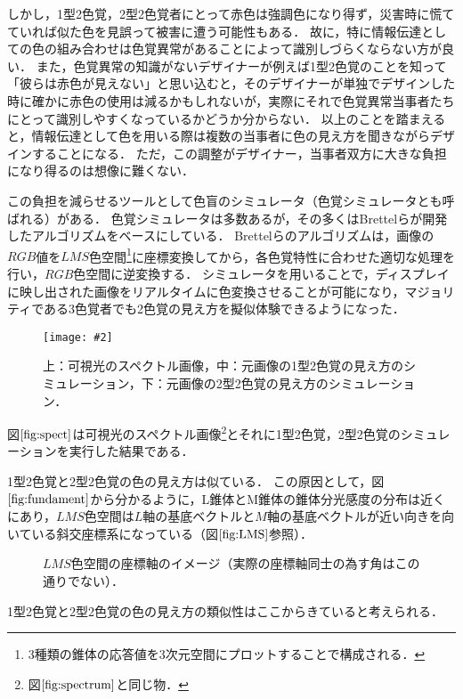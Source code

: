 \documentclass[uplatex,paper=a4,fontsize=4.0truemm,jafontsize=4.0truemm,head_space=30.0truemm,foot_space=30.0truemm,baselineskip=8.0truemm,line_length=40zw,gutter=25.0truemm,oneside,openany,fleqn,hanging_panctuation,open_bracket_pos=nibu_tentsuki,dvipdfmx,jis2004,book,titlepage]{jlreq}
\theoremstyle{mystyle}
\newcommand{\captiondot}[1]{\caption{#1．}}
\newcommand{\figureinput}[4]{\begin{figure}[btp]\centering\texttt{[image: \#2]}\captiondot{#3}\label{fig:#4}\end{figure}}
\newcommand{\mathdisplaystyle}[1]{\(\displaystyle{#1}\)}
\newcommand{\Reference}[1]{\mathdisplaystyle{\ref{#1}}}
\begin{document}
			しかし，1型2色覚，2型2色覚者にとって赤色は強調色になり得ず，災害時に慌てていれば似た色を見誤って被害に遭う可能性もある．
			故に，特に情報伝達としての色の組み合わせは色覚異常があることによって識別しづらくならない方が良い．
			また，色覚異常の知識がないデザイナーが例えば1型2色覚のことを知って「彼らは赤色が見えない」と思い込むと，そのデザイナーが単独でデザインした時に確かに赤色の使用は減るかもしれないが，実際にそれで色覚異常当事者たちにとって識別しやすくなっているかどうか分からない．
			以上のことを踏まえると，情報伝達として色を用いる際は複数の当事者に色の見え方を聞きながらデザインすることになる．
			ただ，この調整がデザイナー，当事者双方に大きな負担になり得るのは想像に難くない．

			この負担を減らせるツールとして色盲のシミュレータ（色覚シミュレータとも呼ばれる）がある．
			色覚シミュレータは多数あるが，その多くはBrettelらが開発したアルゴリズム\cite{Brettel1997}をベースにしている．
			Brettelらのアルゴリズムは，画像の\mathdisplaystyle{RGB}値を\mathdisplaystyle{LMS}色空間\footnote{3種類の錐体の応答値を3次元空間にプロットすることで構成される．}に座標変換してから，各色覚特性に合わせた適切な処理を行い，\mathdisplaystyle{RGB}色空間に逆変換する．
			シミュレータを用いることで，ディスプレイに映し出された画像をリアルタイムに色変換させることが可能になり，マジョリティである3色覚者でも2色覚の見え方を擬似体験できるようになった．
			\figureinput{width=10truecm}{D:/a/figs/S__53141507.jpg}{上：可視光のスペクトル画像，中：元画像の1型2色覚の見え方のシミュレーション，下：元画像の2型2色覚の見え方のシミュレーション}{spect}
			図\Reference{fig:spect}は可視光のスペクトル画像\footnote{図\protect\Reference{fig:spectrum}と同じ物．}とそれに1型2色覚，2型2色覚のシミュレーションを実行した結果である．
			
			1型2色覚と2型2色覚の色の見え方は似ている．
			この原因として，図\Reference{fig:fundament}から分かるように，L錐体とM錐体の錐体分光感度の分布は近くにあり，\mathdisplaystyle{LMS}色空間は\mathdisplaystyle{L}軸の基底ベクトルと\mathdisplaystyle{M}軸の基底ベクトルが近い向きを向いている斜交座標系になっている（図\Reference{fig:LMS}参照）．
			\begin{figure}[tbp]
				\centering
				\captiondot{\protect\mathdisplaystyle{LMS}色空間の座標軸のイメージ（実際の座標軸同士の為す角はこの通りでない）}\label{fig:LMS}
			\end{figure}
			1型2色覚と2型2色覚の色の見え方の類似性はここからきていると考えられる．
\end{document}
